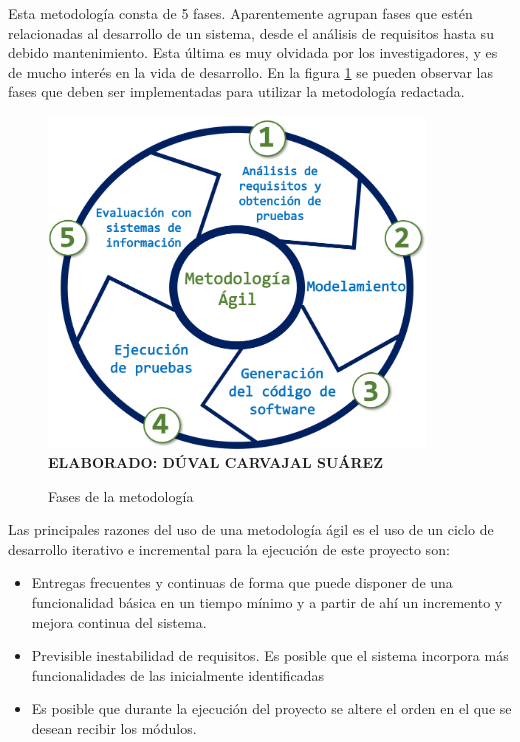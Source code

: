 Esta metodología consta de 5 fases. Aparentemente agrupan fases que estén relacionadas al desarrollo de un sistema, desde el análisis de requisitos hasta su debido mantenimiento. Esta última es muy olvidada por los investigadores, y es de mucho interés en la vida de desarrollo. En la figura \ref{fig:metod} se pueden observar las fases que deben ser implementadas para utilizar la metodología redactada.

\begin{figure}[h!]
	\caption{Fases de la metodología}
	\includegraphics[width=10cm]{img/metodologia.png}
	\label{fig:metod}
	\textbf{\\ ELABORADO: DÚVAL CARVAJAL SUÁREZ}
\end{figure}

Las principales razones del uso de una metodología ágil es el uso de un ciclo de desarrollo iterativo e incremental para la ejecución de este proyecto son:

\begin{itemize}
	\item Entregas frecuentes y continuas de forma que puede disponer de una funcionalidad básica en un tiempo mínimo y a partir de ahí un incremento y mejora continua del sistema.
	
	\item Previsible inestabilidad de requisitos. Es posible que el sistema incorpora más funcionalidades de las inicialmente identificadas
	
	\item Es posible que durante la ejecución del proyecto se altere el orden en el que se desean recibir los módulos.
\end{itemize} 

